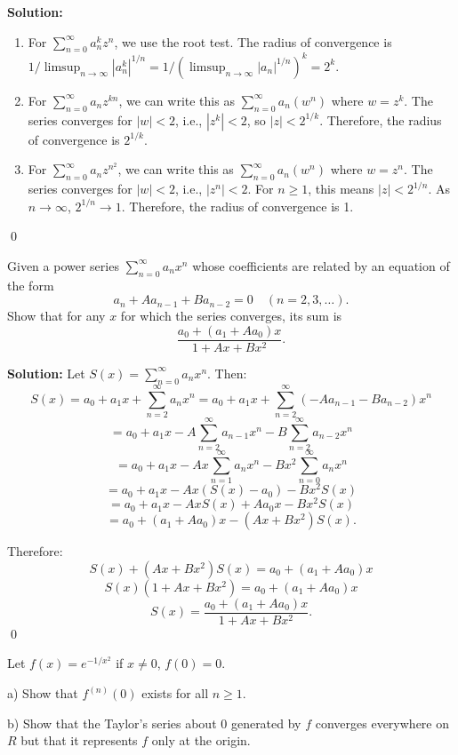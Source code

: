 \noindent\textbf{Solution:}
\begin{enumerate}[label=(\alph*)]
\item For \( \sum_{n=0}^{\infty} a_n^k z^n \), we use the root test. The radius of convergence is \( 1/\limsup_{n\to\infty} |a_n^k|^{1/n} = 1/(\limsup_{n\to\infty} |a_n|^{1/n})^k = 2^k \).

\item For \( \sum_{n=0}^{\infty} a_nz^{kn} \), we can write this as \( \sum_{n=0}^{\infty} a_n(w^n) \) where \( w = z^k \). The series converges for \( |w| < 2 \), i.e., \( |z^k| < 2 \), so \( |z| < 2^{1/k} \). Therefore, the radius of convergence is \( 2^{1/k} \).

\item For \( \sum_{n=0}^{\infty} a_nz^{n^2} \), we can write this as \( \sum_{n=0}^{\infty} a_n(w^n) \) where \( w = z^n \). The series converges for \( |w| < 2 \), i.e., \( |z^n| < 2 \). For \( n \geq 1 \), this means \( |z| < 2^{1/n} \). As \( n \to \infty \), \( 2^{1/n} \to 1 \). Therefore, the radius of convergence is 1.
\end{enumerate}\qed


\begin{problembox}
Given a power series \( \sum_{n=0}^{\infty} a_nx^n \) whose coefficients are related by an equation of the form
\[ a_n + Aa_{n-1} + Ba_{n-2} = 0 \quad (n = 2, 3, \ldots). \]
Show that for any \( x \) for which the series converges, its sum is
\[ \frac{a_0 + (a_1 + Aa_0)x}{1 + Ax + Bx^2}. \]
\end{problembox}

\noindent\textbf{Solution:} Let \( S(x) = \sum_{n=0}^{\infty} a_nx^n \). Then:
\[S(x) = a_0 + a_1x + \sum_{n=2}^{\infty} a_nx^n = a_0 + a_1x + \sum_{n=2}^{\infty} (-Aa_{n-1} - Ba_{n-2})x^n\]
\[= a_0 + a_1x - A\sum_{n=2}^{\infty} a_{n-1}x^n - B\sum_{n=2}^{\infty} a_{n-2}x^n\]
\[= a_0 + a_1x - Ax\sum_{n=1}^{\infty} a_nx^n - Bx^2\sum_{n=0}^{\infty} a_nx^n\]
\[= a_0 + a_1x - Ax(S(x) - a_0) - Bx^2S(x)\]
\[= a_0 + a_1x - AxS(x) + Aa_0x - Bx^2S(x)\]
\[= a_0 + (a_1 + Aa_0)x - (Ax + Bx^2)S(x).\]

Therefore:
\[S(x) + (Ax + Bx^2)S(x) = a_0 + (a_1 + Aa_0)x\]
\[S(x)(1 + Ax + Bx^2) = a_0 + (a_1 + Aa_0)x\]
\[S(x) = \frac{a_0 + (a_1 + Aa_0)x}{1 + Ax + Bx^2}.\]\qed


\begin{problembox}
Let \( f(x) = e^{-1/x^2} \) if \( x \neq 0 \), \( f(0) = 0 \).

a) Show that \( f^{(n)}(0) \) exists for all \( n \geq 1 \).

b) Show that the Taylor's series about 0 generated by \( f \) converges everywhere on \( R \) but that it represents \( f \) only at the origin.
\end{problembox}

